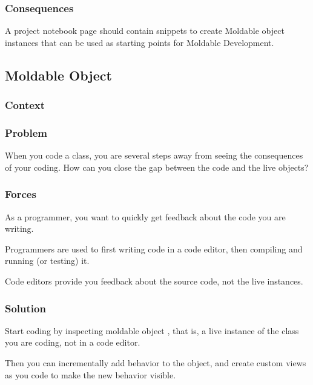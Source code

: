 \documentclass[sigconf]{acmart}
\begin{document}
\subsubsection*{Consequences}

A project notebook page should contain snippets to create Moldable object instances that can be used as starting points for Moldable Development.

\subsection*{Moldable Object}\label{pat:moldableObject}


\subsubsection*{Context}
\subsubsection*{Problem}

When you code a class, you are several steps away from seeing the consequences of your coding. How can you close the gap between the code and the live objects?

\subsubsection*{Forces}

As a programmer, you want to quickly get feedback about the code you are writing.

Programmers are used to first writing code in a code editor, then compiling and running (or testing) it.

Code editors provide you feedback about the source code, not the live instances.

\subsubsection*{Solution}

Start coding by inspecting moldable object , that is, a live instance of the class you are coding, not in a code editor.

Then you can incrementally add behavior to the object, and create custom views as you code to make the new behavior visible.
\end{document}
